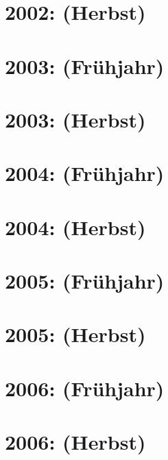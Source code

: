 \documentclass{lehramt-informatik-haupt}
\begin{document}
\section{2002: (Herbst)}


\section{2003: (Frühjahr)}


\section{2003: (Herbst)}


\section{2004: (Frühjahr)}


\section{2004: (Herbst)}


\section{2005: (Frühjahr)}


\section{2005: (Herbst)}


\section{2006: (Frühjahr)}


\section{2006: (Herbst)}

\end{document}
